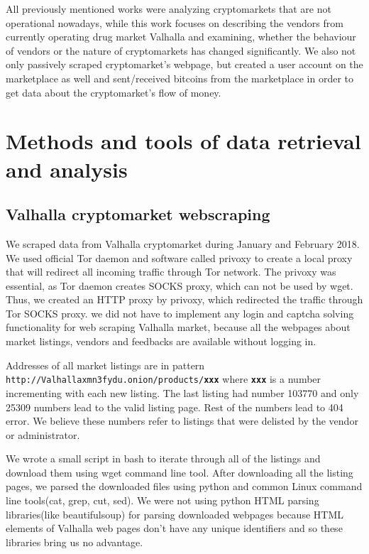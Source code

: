 \documentclass[
  digital, %
  table,   %
  lof,     %
  lot,     %
  oneside
]{fithesis3}
\begin{document}
 All previously mentioned works were analyzing cryptomarkets that are not operational nowadays,
 while this work focuses on describing the vendors from currently operating drug market Valhalla 
 and examining, whether the behaviour of vendors or the nature of cryptomarkets
 has changed significantly. We also not only passively scraped cryptomarket's webpage,
 but created a user account on the marketplace as well and sent/received bitcoins from the marketplace
 in order to get data about the cryptomarket's flow of money.
 
\chapter{Methods and tools of data retrieval and analysis}

\section{Valhalla cryptomarket webscraping}
\label{Valhalla cryptomarket webscraping}
We scraped data from Valhalla cryptomarket
during January and February 2018. 
We used official Tor daemon and software called privoxy to create a local proxy that will redirect all
incoming traffic through Tor network. The privoxy was essential, as Tor daemon creates SOCKS proxy,
which can not be used by wget. Thus, we created an HTTP proxy by privoxy,
which redirected the traffic through Tor SOCKS proxy.
we did not have to implement any login and captcha solving functionality
for web scraping Valhalla market, because all the webpages about market
listings, vendors and feedbacks are available without logging in.

Addresses of all market listings are in pattern\newline
\texttt{http://Valhallaxmn3fydu.onion/products/\textbf{xxx}} where \texttt{\textbf{xxx}}
is a number incrementing with each new listing.
The last listing had number 103770 and only 25309 numbers lead to the valid listing page.
Rest of the numbers lead to 404 error. We believe
these numbers refer to listings that were delisted by the vendor or administrator.


We wrote a small script in bash to iterate through all of the listings
and download them using wget command line tool.
After downloading all the listing pages,
we parsed the downloaded files using python and common Linux command line tools(cat, grep, cut, sed).
We were not using python HTML parsing libraries(like beautifulsoup) for parsing downloaded
webpages because HTML elements of Valhalla web pages don't have any unique identifiers
and so these libraries bring us no advantage.
 
\end{document}
